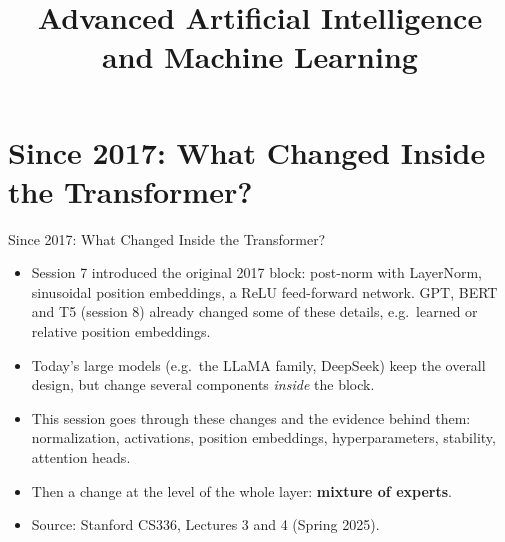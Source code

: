 




\newcommand{\citebutton}[2]{\beamergotobutton{\href{#2}{#1}}}

\newcommand{\titlefigure}{figure/title-modern-variant.png}
\newcommand{\learninggoals}{
  \item What changed in the Transformer block since 2017 and why: pre-norm, RMSNorm, no biases, gated activations
  \item Rotary position embeddings (RoPE)
  \item The consensus hyperparameters of modern language models
  \item Stability tricks and attention variants (MQA/GQA, sliding windows), and why memory matters
  \item Mixture of experts: motivation and routing
}

\title{Advanced Artificial Intelligence and Machine Learning}
\date{}




\section{Since 2017: What Changed Inside the Transformer?}

\begin{frame}{Since 2017: What Changed Inside the Transformer?}
\begin{itemize}
  \item Session 7 introduced the original 2017 block: post-norm with LayerNorm, sinusoidal position embeddings, a ReLU feed-forward network. GPT, BERT and T5 (session 8) already changed some of these details, e.g.\ learned or relative position embeddings.
  \item Today's large models (e.g.\ the LLaMA family, DeepSeek) keep the overall design, but change several components \emph{inside} the block.
  \item This session goes through these changes and the evidence behind them: normalization, activations, position embeddings, hyperparameters, stability, attention heads.
  \item Then a change at the level of the whole layer: \textbf{mixture of experts}.
  \item Source: Stanford CS336, Lectures 3 and 4 (Spring 2025).
\end{itemize}
\end{frame}

